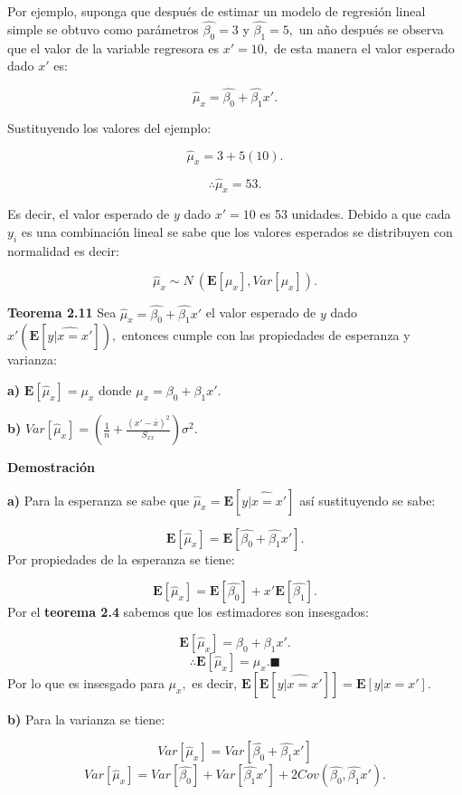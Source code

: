 \documentclass[
  a4paper,
  oneside,
  openany]{book}
\begin{document}
Por ejemplo, suponga que después de estimar un modelo de regresión lineal simple se obtuvo como parámetros \(\hat{\beta_{0}}=3\) y \(\hat{\beta_{1}}=5,\) un año después se observa que el valor de la variable regresora es \(x'=10,\) de esta manera el valor esperado dado \(x'\) es:

\[\hat{\mu}_{x}=\hat{\beta_{0}}+\hat{\beta_{1}}x'.\]

Sustituyendo los valores del ejemplo:

\[\hat{\mu}_{x}=3+5(10).\]

\[\therefore \hat{\mu}_{x}=53.\]

Es decir, el valor esperado de \(y\) dado \(x'=10\) es 53 unidades. Debido a que cada \(y_{i}\) es una combinación lineal se sabe que los valores esperados se distribuyen con normalidad es decir:

\[\hat{\mu}_{x}\sim N \ (\mathbf{E}[\mu_{x}],Var[\mu_{x}]).\]

\textbf{Teorema 2.11} Sea \(\hat{\mu}_{x}=\hat{\beta_{0}}+\hat{\beta_{1}}x'\) el valor esperado de \(y\) dado \(x'\left( \mathbf{E}[\widehat{y|x=x'}]\right),\) entonces cumple con las propiedades de esperanza y varianza:

\textbf{a)} \(\mathbf{E}[\hat{\mu}_{x}]=\mu_{x}\) donde \(\mu_{x}=\beta_{0}+\beta_{1}x'.\)

\textbf{b)} \(Var[\hat{\mu}_{x}]=\left(\frac{1}{n}+\frac{(x'-\overline{x})^2}{S_{xx}}\right)\sigma^2.\)

\textbf{Demostración}

\textbf{a)} Para la esperanza se sabe que \(\hat{\mu}_{x}=\mathbf{E}[\widehat{y|x=x'}]\) así sustituyendo se sabe:

\[\mathbf{E}[\hat{\mu}_{x}]=\mathbf{E}\left[\hat{\beta_{0}}+\hat{\beta_{1}}x' \right].\]
Por propiedades de la esperanza se tiene:

\[\mathbf{E}[\hat{\mu}_{x}]=\mathbf{E}\left[\hat{\beta_{0}}\right]+x'\mathbf{E}\left[\hat{\beta_{1}} \right].\]
Por el \textbf{teorema 2.4} sabemos que los estimadores son insesgados:

\[\mathbf{E}[\hat{\mu}_{x}]=\beta_{0}+\beta_{1}x'.\]
\[\therefore \mathbf{E}[\hat{\mu}_{x}]=\mu_{x}. \blacksquare\]
Por lo que es insesgado para \(\mu_{x},\) es decir, \(\mathbf{E}\left[\mathbf{E}[\widehat{y|x=x'}] \right]=\mathbf{E}[y|x=x'].\)

\textbf{b)} Para la varianza se tiene:

\[Var[\hat{\mu}_{x}]=Var\left[\hat{\beta_{0}}+\hat{\beta_{1}}x'\right]\]
\[Var[\hat{\mu}_{x}]=Var[\hat{\beta_{0}}]+Var[\hat{\beta_{1}}x']+2Cov(\hat{\beta_{0}},\hat{\beta_{1}}x').\]
\end{document}
